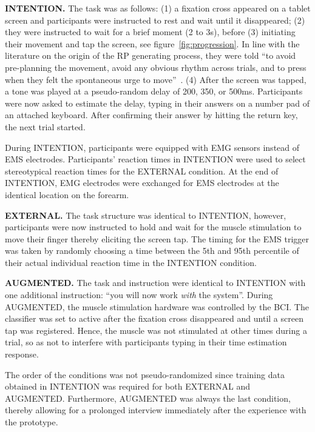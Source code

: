\indent\textbf{INTENTION.} The task was as follows: (1) a fixation cross appeared on a tablet screen and participants were instructed to rest and wait until it disappeared; (2) they were instructed to wait for a brief moment (2 to 3s), before (3) initiating their movement and tap the screen, see figure~\ref{fig:progression}. In line with the literature on the origin of the RP generating process, they were told ``to avoid pre-planning the movement, avoid any obvious rhythm across trials, and to press when they felt the spontaneous urge to move''~\cite{Schultze-Kraft2021-cu}. (4) After the screen was tapped, a tone was played at a pseudo-random delay of 200, 350, or 500ms. Participants were now asked to estimate the delay, typing in their answers on a number pad of an attached keyboard. After confirming their answer by hitting the return key, the next trial started.

During INTENTION, participants were equipped with EMG sensors instead of EMS electrodes. Participants' reaction times in INTENTION were used to select stereotypical reaction times for the EXTERNAL condition. At the end of INTENTION, EMG electrodes were exchanged for EMS electrodes at the identical location on the forearm.


\indent\textbf{EXTERNAL.} The task structure was identical to INTENTION, however, participants were now instructed to hold and wait for the muscle stimulation to move their finger thereby eliciting the screen tap. The timing for the EMS trigger was taken by randomly choosing a time between the 5th and 95th percentile of their actual individual reaction time in the INTENTION condition. 

\indent\textbf{AUGMENTED.} The task and instruction were identical to INTENTION with one additional instruction: ``you will now work \textit{with} the system''. During AUGMENTED, the muscle stimulation hardware was controlled by the BCI. The classifier was set to active after the fixation cross disappeared and until a screen tap was registered. Hence, the muscle was not stimulated at other times during a trial, so as not to interfere with participants typing in their time estimation response.

The order of the conditions was not pseudo-randomized since training data obtained in INTENTION was required for both EXTERNAL and AUGMENTED. Furthermore, AUGMENTED was always the last condition, thereby allowing for a prolonged interview immediately after the experience with the prototype.

